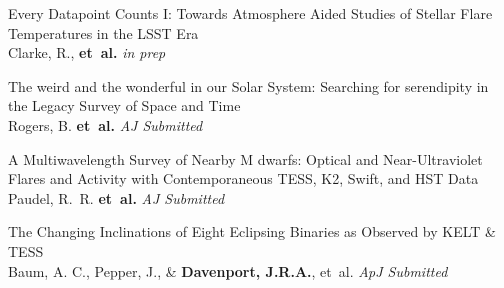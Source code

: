 \begin{etaremune}[leftmargin=10pt]








\item{\sc Every Datapoint Counts I: Towards Atmosphere Aided Studies of Stellar Flare Temperatures in the LSST Era}\\
Clarke, R., {\bf et~al.} {\em in prep}

\item{\sc The weird and the wonderful in our Solar System: Searching for serendipity in the Legacy Survey of Space and Time}\\
Rogers, B. {\bf et~al.} {\em AJ Submitted}

\item{\sc A Multiwavelength Survey of Nearby M dwarfs: Optical and Near-Ultraviolet Flares and Activity with Contemporaneous TESS, K2, Swift, and HST Data}\\
Paudel, R.~R. {\bf et~al.} {\em AJ Submitted}


\item{\sc The Changing Inclinations of Eight Eclipsing Binaries as Observed by KELT \& TESS}\\
Baum, A. C., Pepper, J., \& {\bf Davenport,  J.R.A.},  et~al. {\em ApJ Submitted}


\end{etaremune}
